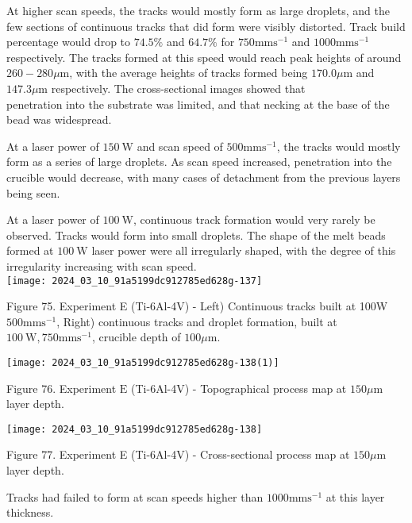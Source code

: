 \documentclass[10pt]{article}
\begin{document}
At higher scan speeds, the tracks would mostly form as large droplets, and the few sections of continuous tracks that did form were visibly distorted. Track build percentage would drop to $74.5 \%$ and $64.7 \%$ for $750 \mathrm{mms}^{-1}$ and $1000 \mathrm{mms}^{-1}$ respectively. The tracks formed at this speed would reach peak heights of around $260-280 \mu \mathrm{m}$, with the average heights of tracks formed being $170.0 \mu \mathrm{m}$ and $147.3 \mu \mathrm{m}$ respectively. The cross-sectional images showed that\\
penetration into the substrate was limited, and that necking at the base of the bead was widespread.

At a laser power of $150 \mathrm{~W}$ and scan speed of $500 \mathrm{mms}^{-1}$, the tracks would mostly form as a series of large droplets. As scan speed increased, penetration into the crucible would decrease, with many cases of detachment from the previous layers being seen.

At a laser power of $100 \mathrm{~W}$, continuous track formation would very rarely be observed. Tracks would form into small droplets. The shape of the melt beads formed at $100 \mathrm{~W}$ laser power were all irregularly shaped, with the degree of this irregularity increasing with scan speed.\\
\texttt{[image: 2024\_03\_10\_91a5199dc912785ed628g-137]}

Figure 75. Experiment E (Ti-6Al-4V) - Left) Continuous tracks built at 100W $500 \mathrm{mms}^{-1}$, Right) continuous tracks and droplet formation, built at $100 \mathrm{~W}, 750 \mathrm{mms}^{-1}$, crucible depth of $100 \mu \mathrm{m}$.

\begin{center}
\texttt{[image: 2024\_03\_10\_91a5199dc912785ed628g-138(1)]}
\end{center}

Figure 76. Experiment $\mathrm{E}$ (Ti-6Al-4V) - Topographical process map at $150 \mu \mathrm{m}$ layer depth.

\begin{center}
\texttt{[image: 2024\_03\_10\_91a5199dc912785ed628g-138]}
\end{center}

Figure 77. Experiment E (Ti-6Al-4V) - Cross-sectional process map at $150 \mu \mathrm{m}$ layer depth.

Tracks had failed to form at scan speeds higher than $1000 \mathrm{mms}^{-1}$ at this layer thickness.
\end{document}
